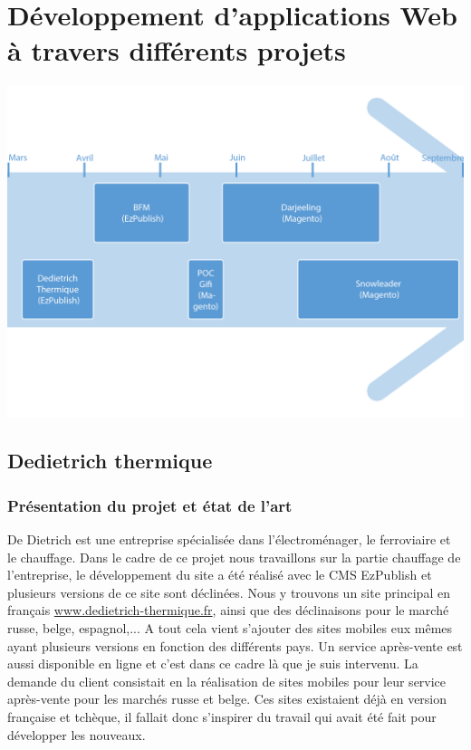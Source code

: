 \documentclass[a4paper,11pt,twoside]{report}
\begin{document}
\chapter{Développement d'applications Web à travers différents projets}
    \begin{center}
	  \includegraphics[width=\textwidth]{images/frise_small.png} 
	  \label{frise_small}
    \end{center}
  \section{Dedietrich thermique}
    \subsection*{Présentation du projet et état de l'art}
    De Dietrich est une entreprise spécialisée dans l'électroménager, le ferroviaire et le chauffage. Dans le cadre de ce projet nous travaillons sur la partie chauffage de l'entreprise, le développement du site a été réalisé avec le CMS EzPublish et plusieurs versions de ce site sont déclinées. Nous y trouvons un site principal en français \url{www.dedietrich-thermique.fr}, ainsi que des déclinaisons pour le marché russe, belge, espagnol,... A tout cela vient s'ajouter des sites mobiles eux mêmes ayant plusieurs versions en fonction des différents pays. Un service après-vente est aussi disponible en ligne et c'est dans ce cadre là que je suis intervenu. La demande du client consistait en la réalisation de sites mobiles pour leur service après-vente pour les marchés russe et belge. Ces sites existaient déjà en version française et tchèque, il fallait donc s'inspirer du travail qui avait été fait pour développer les nouveaux. 
\end{document}
